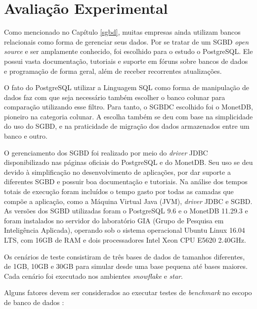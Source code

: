 \graphicspath{ {6-Experimento/} }

\chapter{Avaliação Experimental}

Como mencionado no Capítulo \ref{sgbd}, muitas empresas ainda utilizam 
bancos relacionais como forma de gerenciar seus dados. 
Por se tratar de um SGBD \textit{open source} e ser amplamente 
conhecido, foi escolhido para o estudo o PostgreSQL. Ele possui vasta 
documentação, tutoriais e suporte em fóruns sobre bancos de dados e 
programação de forma geral, além de receber recorrentes atualizações. 

O fato do PostgreSQL utilizar a Linguagem SQL como forma de 
manipulação de dados faz com que seja necessário também escolher 
o banco colunar para comparação utilizando esse filtro. Para tanto, o 
SGBDC escolhido foi o MonetDB, pioneiro na categoria colunar. A escolha também 
se deu com base na simplicidade do uso do SGBD, e na praticidade de 
migração dos dados armazenados entre um banco e outro. 

O gerenciamento dos SGBD foi realizado por meio do \textit{driver} JDBC 
disponibilizado nas páginas oficiais do PostgreSQL e do MonetDB. Seu uso se deu 
devido à simplificação no desenvolvimento de aplicações, por dar suporte a 
diferentes SGBD e possuir boa documentação e tutoriais. Na análise dos tempos totais de execução foram incluídos o tempo gasto por todas as camadas que compõe a aplicação, como a Máquina Virtual Java (JVM), \textit{driver} JDBC e SGBD. As versões dos SGBD utilizadas 
foram o PostgreSQL 9.6 e o MonetDB 11.29.3 e foram instalados no servidor do laboratório GIA (Grupo de Pesquisa em Inteligência Aplicada), operando sob o 
sistema operacional Ubuntu Linux 16.04 LTS, com 16GB de RAM e dois 
processadores Intel Xeon CPU E5620 2.40GHz.

Os cenários de teste consistiram de três bases de dados de tamanhos 
diferentes, de 1GB, 10GB e 30GB para simular desde uma base pequena 
até bases maiores. Cada cenário foi executado nos ambientes \textit{snowflake} e 
\textit{star}.

Alguns fatores devem ser considerados ao executar testes de \textit{benchmark} 
no escopo de banco de dados \cite{raasveldt2018fair}:

